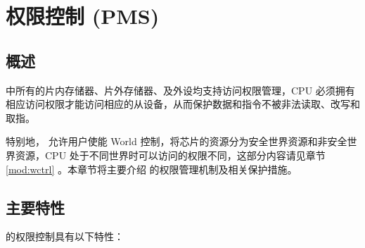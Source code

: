 \documentclass[main\_\_CN.tex]{subfiles}
\begin{document}

\ifglobal
\else
    {\let\clearpage\relax \listoftodos}
    \tableofcontents
    \listoftables
    \listoffigures
\fi



\hypertarget{permctrl}{}
\chapter{权限控制 (PMS)}
\label{mod:permctrl}

\section{概述}
\chipname{} 中所有的片内存储器、片外存储器、及外设均支持访问权限管理，CPU 必须拥有相应访问权限才能访问相应的从设备，从而保护数据和指令不被非法读取、改写和取指。

特别地，\chipname{} 允许用户使能 World 控制，将芯片的资源分为安全世界资源和非安全世界资源，CPU 处于不同世界时可以访问的权限不同，这部分内容请见章节 \ref{mod:wctrl} \textit{}。本章节将主要介绍 \chipname{} 的权限管理机制及相关保护措施。



\section{主要特性}

\chipname{} 的权限控制具有以下特性：
\end{document}
